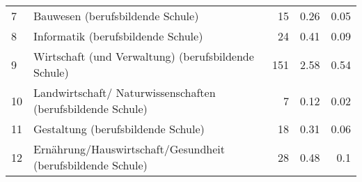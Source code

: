 \begin{longtable}{lXrrr}
     7 &
     \multicolumn{1}{X}{ Bauwesen (berufsbildende Schule)   } &


       \num{15} &
       \num[round-mode=places,round-precision=2]{0.26} &
         \num[round-mode=places,round-precision=2]{0.05} \\

     8 &
     \multicolumn{1}{X}{ Informatik (berufsbildende Schule)   } &


       \num{24} &
       \num[round-mode=places,round-precision=2]{0.41} &
         \num[round-mode=places,round-precision=2]{0.09} \\

     9 &
     \multicolumn{1}{X}{ Wirtschaft (und Verwaltung) (berufsbildende Schule)   } &


       \num{151} &
       \num[round-mode=places,round-precision=2]{2.58} &
         \num[round-mode=places,round-precision=2]{0.54} \\

     10 &
     \multicolumn{1}{X}{ Landwirtschaft/ Naturwissenschaften (berufsbildende Schule)   } &


       \num{7} &
       \num[round-mode=places,round-precision=2]{0.12} &
         \num[round-mode=places,round-precision=2]{0.02} \\

     11 &
     \multicolumn{1}{X}{ Gestaltung (berufsbildende Schule)   } &


       \num{18} &
       \num[round-mode=places,round-precision=2]{0.31} &
         \num[round-mode=places,round-precision=2]{0.06} \\

     12 &
     \multicolumn{1}{X}{ Ernährung/Hauswirtschaft/Gesundheit (berufsbildende Schule)   } &


       \num{28} &
       \num[round-mode=places,round-precision=2]{0.48} &
         \num[round-mode=places,round-precision=2]{0.1} \\


\end{longtable}
